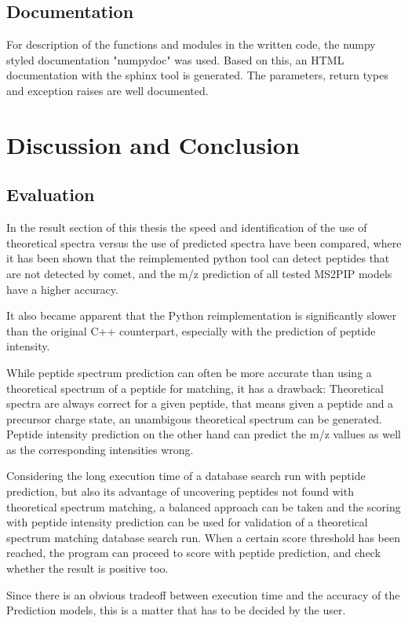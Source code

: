 \documentclass[11pt]{article}
\begin{document}
\subsection{Documentation}
For description of the functions and modules in the written code, the numpy styled documentation "numpydoc" was used. Based on this, an HTML documentation with the sphinx tool is generated. The parameters, return types and exception raises are well documented.

\section{Discussion and Conclusion}
\subsection{Evaluation}
In the result section of this thesis the speed and identification of the use of theoretical spectra versus the use of predicted spectra have been compared, where it has been shown that the reimplemented python tool can detect peptides that are not detected by comet, and the m/z prediction of all tested MS2PIP models have a higher accuracy.

It also became apparent that the Python reimplementation is significantly slower than the original C++ counterpart, especially with the prediction of peptide intensity.

While peptide spectrum prediction can often be more accurate than using a theoretical spectrum of a peptide for matching,
it has a drawback: Theoretical spectra are always correct for a given peptide, that means given a peptide and a precursor charge state, an unambigous theoretical spectrum can be generated. Peptide intensity prediction on the other hand can predict the m/z vallues as well as the corresponding intensities wrong.

Considering the long execution time of a database search run with peptide prediction, but also its advantage of uncovering peptides not found with theoretical spectrum matching, a balanced approach can be taken and the scoring with peptide intensity prediction can be used for validation of a theoretical spectrum matching database search run. When a certain score threshold has been reached, the program can proceed to score with peptide prediction, and check whether the result is positive too.

Since there is an obvious tradeoff between execution time and the accuracy of the Prediction models, this is a matter that has to be decided by the user.
\end{document}
